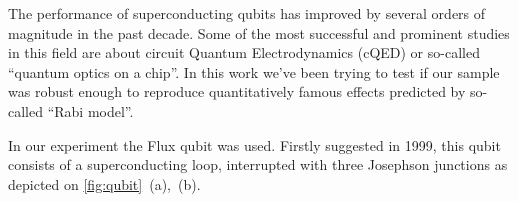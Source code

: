 \documentclass[a0, portrait]{a0poster}
\begin{document}
\vspace{-1.5cm}
\begin{multicols}{2}							%


\begin{tcolorbox}[left=1cm, right=1cm, top=0.5cm, bottom=0.5cm, 
                  title={\Large Introduction}, bottomtitle=.5cm,toptitle=.5cm]
\begingroup
\setlength{\columnsep}{1cm}	
\begin{multicols}{2}
The performance of superconducting qubits has improved by several orders of magnitude in the past decade. Some of the most successful and prominent studies \cite{bishop2009} in this field are about circuit Quantum Electrodynamics (cQED) or so-called ``quantum optics on a chip''. In this work we've been trying to test if our sample was robust enough to reproduce quantitatively famous effects predicted by so-called ``Rabi model''.
\end{multicols}
\endgroup
\end{tcolorbox}

\begin{tcolorbox}[left=1cm, right=1cm, top=0.5cm, bottom=0.5cm, 
                  title={\Large Flux qubit}, bottomtitle=.3cm, toptitle=.5cm
                  ]

In our experiment the Flux qubit was used. Firstly suggested in 1999, this qubit consists of a superconducting loop, interrupted with three Josephson junctions as depicted on \autoref{fig:qubit}~(a),~(b).\\


\end{tcolorbox}
\end{multicols}
\end{document}
